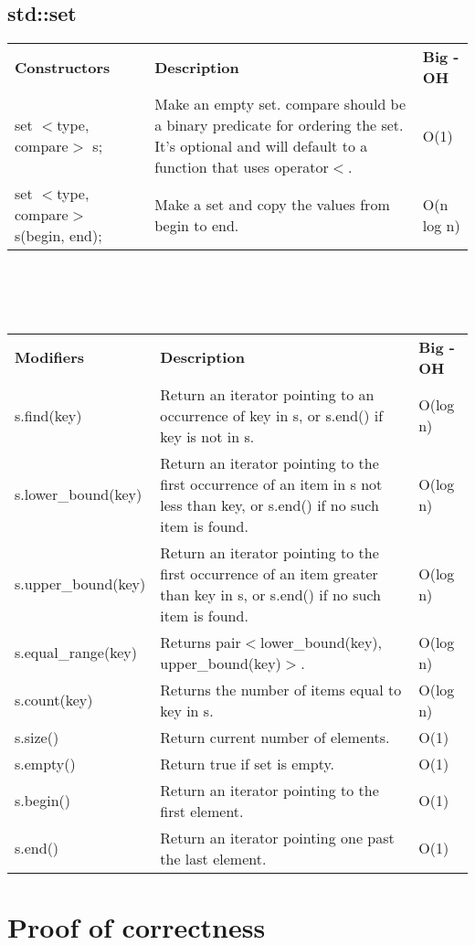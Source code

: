\documentclass[12pt]{article}
\begin{document}
\subsection{std::set}
\begin{tabular}{ p{5cm} p{7cm} p{5cm}}
\textbf{Constructors} & \textbf{Description} & \textbf{Big - OH}\\
set $<$type, compare$>$ s; & Make an empty set. compare should be a binary predicate for ordering the set. It's optional and will default to a function that uses operator$<$. & O(1)\\
set $<$type, compare$>$ s(begin, end); & Make a set and copy the values from begin to end. & O(n log n)
\end{tabular}
\\
\\
\\
\begin{tabular}{ p{5cm} p{7cm}  p{5cm}}
\textbf{Modifiers} & \textbf{Description} & \textbf{Big - OH}\\
s.find(key) & Return an iterator pointing to an occurrence of key in s, or s.end() if key is not in s. & O(log n)\\
s.lower\_bound(key) & Return an iterator pointing to the first occurrence of  an item in s not less than key, or s.end() if no such item is found. & O(log n)\\
s.upper\_bound(key) & Return an iterator pointing to the first occurrence of  an item greater than key in s, or s.end() if no such item is found. & O(log n)\\
s.equal\_range(key) & Returns pair$<$lower\_bound(key), upper\_bound(key)$>$. & O(log n)\\
s.count(key) & Returns the number of items equal to key in s. & O(log n)\\
s.size() & Return current number of elements. & O(1)\\
s.empty() & Return true if set is empty. & O(1)\\
s.begin() & Return an iterator pointing to the first element. & O(1)\\
s.end() & Return an iterator pointing one past the last element. & O(1)
\end{tabular}

\section[Proof of correctness]{Proof of correctness}



\end{document}

